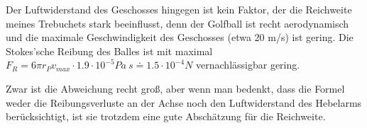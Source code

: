 Der Luftwiderstand des Geschosses hingegen ist kein Faktor, der die Reichweite meines Trebuchets stark beeinflusst, denn der Golfball ist recht aerodynamisch und die maximale Geschwindigkeit des Geschosses (etwa 20 m/s) ist gering. Die Stokes'sche Reibung des Balles ist mit maximal $F_R=6\pi r_P v_{max}\cdot1.9\cdot10^{-5}\unit{Pa\ s}\doteq1.5\cdot10^{-4}\unit{N}$ vernachlässigbar gering.

Zwar ist die Abweichung recht groß, aber wenn man bedenkt, dass die Formel weder die Reibungsverluste an der Achse noch den Luftwiderstand des Hebelarms berücksichtigt, ist sie trotzdem eine gute Abschätzung für die Reichweite.